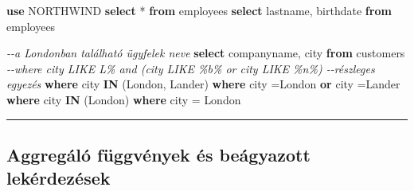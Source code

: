 \documentclass[
  magyar,
]{article}
\newenvironment{Shaded}{}{}
\newcommand{\CommentTok}[1]{\textcolor[rgb]{0.38,0.63,0.69}{\textit{#1}}}
\newcommand{\KeywordTok}[1]{\textcolor[rgb]{0.00,0.44,0.13}{\textbf{#1}}}
\newcommand{\NormalTok}[1]{#1}
\newcommand{\OperatorTok}[1]{\textcolor[rgb]{0.40,0.40,0.40}{#1}}
\newcommand{\StringTok}[1]{\textcolor[rgb]{0.25,0.44,0.63}{#1}}
\begin{document}
\begin{Shaded}
\begin{Highlighting}[]
\KeywordTok{use}\NormalTok{ NORTHWIND}
\KeywordTok{select} \OperatorTok{*} \KeywordTok{from}\NormalTok{ employees}
\KeywordTok{select}\NormalTok{ lastname, birthdate }\KeywordTok{from}\NormalTok{ employees}

\CommentTok{{-}{-}a Londonban található ügyfelek neve}
\KeywordTok{select}\NormalTok{ companyname, city}
\KeywordTok{from}\NormalTok{ customers}
\CommentTok{{-}{-}where city LIKE \textquotesingle{}L\%\textquotesingle{} and (city LIKE \textquotesingle{}\%b\%\textquotesingle{} or city LIKE \textquotesingle{}\%n\%\textquotesingle{}) {-}{-}részleges egyezés}
\KeywordTok{where}\NormalTok{ city }\KeywordTok{IN}\NormalTok{ (}\StringTok{\textquotesingle{}London\textquotesingle{}}\NormalTok{, }\StringTok{\textquotesingle{}Lander\textquotesingle{}}\NormalTok{)}
\KeywordTok{where}\NormalTok{ city }\OperatorTok{=}\StringTok{\textquotesingle{}London\textquotesingle{}} \KeywordTok{or}\NormalTok{ city }\OperatorTok{=}\StringTok{\textquotesingle{}Lander\textquotesingle{}}
\KeywordTok{where}\NormalTok{ city }\KeywordTok{IN}\NormalTok{ (}\StringTok{\textquotesingle{}London\textquotesingle{}}\NormalTok{)}
\KeywordTok{where}\NormalTok{ city }\OperatorTok{=} \StringTok{\textquotesingle{}London\textquotesingle{}}
\end{Highlighting}
\end{Shaded}

\begin{center}\rule{0.5\linewidth}{0.5pt}\end{center}

\subsection{Aggregáló függvények és beágyazott
lekérdezések}\label{aggreguxe1luxf3-fuxfcggvuxe9nyek-uxe9s-beuxe1gyazott-lekuxe9rdezuxe9sek}
\end{document}
